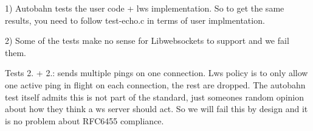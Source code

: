 1) Autobahn tests the user code + lws implementation. So to get the same results, you need to follow test-\/echo.\+c in terms of user implmentation.

2) Some of the tests make no sense for Libwebsockets to support and we fail them.


\begin{DoxyItemize}
\item Tests 2. + 2.\+: sends multiple pings on one connection. Lws policy is to only allow one active ping in flight on each connection, the rest are dropped. The autobahn test itself admits this is not part of the standard, just someone\textquotesingle{}s random opinion about how they think a ws server should act. So we will fail this by design and it is no problem about R\+F\+C6455 compliance. 
\end{DoxyItemize}